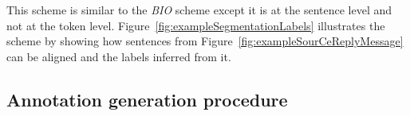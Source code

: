 








%
This scheme is similar to the \textit{BIO} %
scheme except it is at the sentence level and not at the token level.
%
Figure~\ref{fig:exampleSegmentationLabels} illustrates the scheme by showing how sentences from Figure~\ref{fig:exampleSourCeReplyMessage} can be aligned and the labels inferred from it. 




\subsection{Annotation generation procedure}
\label{}



